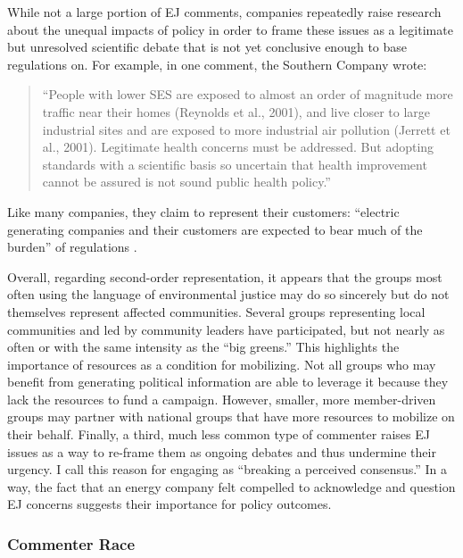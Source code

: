 \documentclass[
      12pt,
        ]{article}
\begin{document}
While not a large portion of EJ comments, companies repeatedly raise research about the unequal impacts of policy in order to frame these issues as a legitimate but unresolved scientific debate that is not yet conclusive enough to base regulations
on. For example, in one comment, the Southern Company wrote:

\begin{quote}
``People with lower SES are exposed to almost an order of magnitude
more traffic near their homes (Reynolds et al., 2001), and live closer
to large industrial sites and are exposed to more industrial air
pollution (Jerrett et al., 2001). Legitimate health concerns must be
addressed. But adopting standards with a scientific basis so uncertain
that health improvement cannot be assured is not sound public health
policy.''
\end{quote}

Like many companies, they claim to represent their customers:
``electric generating companies and their customers are expected to bear
much of the burden'' of regulations \citep{Hobson2004}.

Overall, regarding second-order representation, it appears that the groups
most often using the language of environmental justice may do so
sincerely but do not themselves represent affected communities. Several
groups representing local communities and led by community leaders have
participated, but not nearly as often or with the same intensity as the
``big greens.'' This highlights the importance of resources as a condition
for mobilizing. Not all groups who may benefit from generating political
information are able to leverage it because they lack the resources to
fund a campaign. However, smaller, more
member-driven groups may partner with national groups that have more resources to
mobilize on their behalf.
Finally, a third, much less common type of commenter raises EJ issues
as a way to re-frame them as ongoing debates and thus undermine their
urgency. I call this reason for engaging as ``breaking a perceived
consensus.'' In a way, the fact that an energy company felt compelled to
acknowledge and question EJ concerns suggests their
importance for policy outcomes.

\hypertarget{commenter-race}{%
\subsubsection{Commenter Race}\label{commenter-race}}
\end{document}
